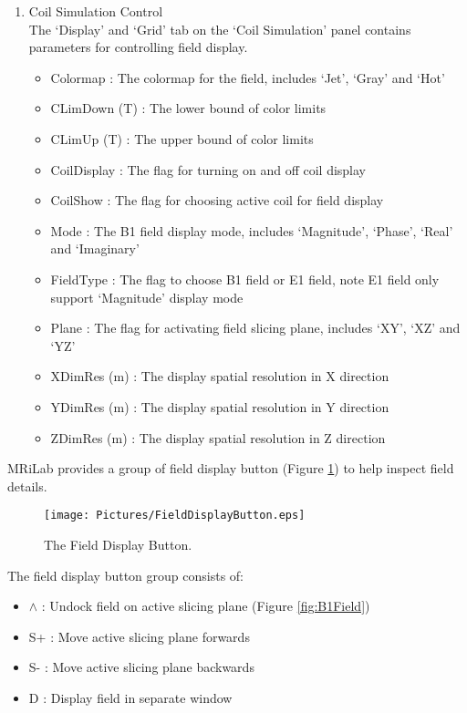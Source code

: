 \documentclass{book}%
\begin{document}
\begin{enumerate}
	\item Coil Simulation Control \\

The `Display' and `Grid' tab on the `Coil Simulation' panel contains parameters for controlling field display.

\begin{itemize}
	\item Colormap : The colormap for the field, includes `Jet', `Gray' and `Hot'
	\item CLimDown (T) : The lower bound of color limits
	\item CLimUp (T) : The upper bound of color limits
	\item CoilDisplay : The flag for turning on and off coil display
	\item CoilShow : The flag for choosing active coil for field display
	\item Mode : The B1 field display mode, includes `Magnitude', `Phase', `Real' and `Imaginary'
	\item FieldType : The flag to choose B1 field or E1 field, note E1 field only support `Magnitude' display mode
	\item Plane : The flag for activating field slicing plane, includes `XY', `XZ' and `YZ'
	\item XDimRes (m) : The display spatial resolution in X direction
	\item YDimRes (m) : The display spatial resolution in Y direction
	\item ZDimRes (m) : The display spatial resolution in Z direction
\end{itemize}	

\end{enumerate}

MRiLab provides a group of field display button (Figure \ref{fig:FieldDisplayButton}) to help inspect field details.

\begin{figure}[htbp]
	\centering
		\texttt{[image: Pictures/FieldDisplayButton.eps]}
	\caption{The Field Display Button.}
	\label{fig:FieldDisplayButton}
\end{figure}

The field display button group consists of:

\begin{itemize}
	\item $\wedge$ : Undock field on active slicing plane (Figure \ref{fig:B1Field})
	\item S+ : Move active slicing plane forwards
	\item S- : Move active slicing plane backwards
	\item D : Display field in separate window
\end{itemize}
\end{document}
